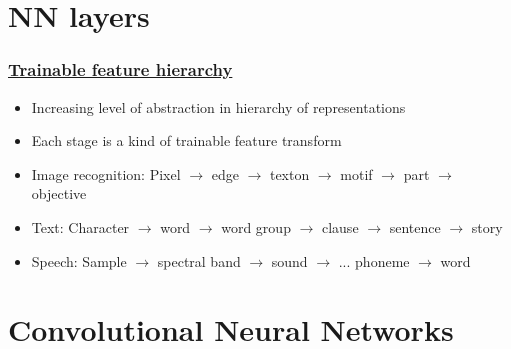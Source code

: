 \documentclass{beamer}
\begin{document}
\section{NN layers}

\begin{frame}
    \frametitle{\href{https://cs.nyu.edu/~yann/talks/lecun-ranzato-icml2013.pdf}{Trainable feature hierarchy}}

    \begin{itemize}
        \item Increasing level of abstraction in hierarchy of representations
        \item Each stage is a kind of trainable feature transform
        \item Image recognition: Pixel $\rightarrow$ edge $\rightarrow$  texton $\rightarrow$  motif $\rightarrow$  part $\rightarrow$  objective
        \item Text: Character $\rightarrow$ word $\rightarrow$ word group $\rightarrow$ clause $\rightarrow$ sentence $\rightarrow$ story
        \item Speech: Sample $\rightarrow$  spectral band $\rightarrow$  sound $\rightarrow$ ... phoneme $\rightarrow$ word
    \end{itemize}
    

\end{frame}

\section{Convolutional Neural Networks}
\end{document}
